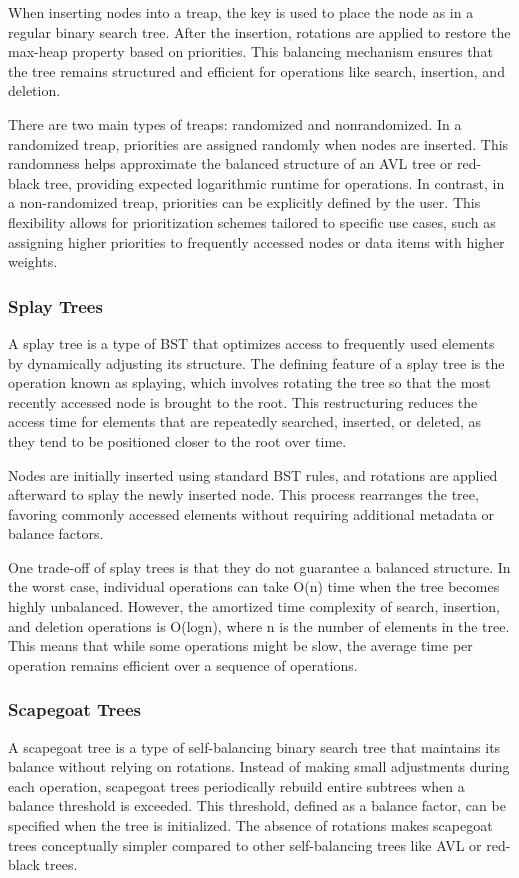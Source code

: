 \documentclass[sigconf]{acmart}
\begin{document}
When inserting nodes into a treap, the key is used to place the node as in a regular binary search tree. After the insertion, rotations are applied to restore the max-heap property based on priorities. This balancing mechanism ensures that the tree remains structured and efficient for operations like search, insertion, and deletion.

There are two main types of treaps: randomized and nonrandomized. In a randomized treap, priorities are assigned randomly when nodes are inserted. This randomness helps approximate the balanced structure of an AVL tree or red-black tree, providing expected logarithmic runtime for operations. In contrast, in a non-randomized treap, priorities can be explicitly defined by the user. This flexibility allows for prioritization schemes tailored to specific use cases, such as assigning higher priorities to frequently accessed nodes or data items with higher weights.

\subsubsection{Splay Trees}
A splay tree is a type of BST that optimizes access to frequently used elements by dynamically adjusting its structure. The defining feature of a splay tree is the operation known as splaying, which involves rotating the tree so that the most recently accessed node is brought to the root. This restructuring reduces the access time for elements that are repeatedly searched, inserted, or deleted, as they tend to be positioned closer to the root over time.

Nodes are initially inserted using standard BST rules, and rotations are applied afterward to splay the newly inserted node. This process rearranges the tree, favoring commonly accessed elements without requiring additional metadata or balance factors.

One trade-off of splay trees is that they do not guarantee a balanced structure. In the worst case, individual operations can take O(n) time when the tree becomes highly unbalanced. However, the amortized time complexity of search, insertion, and deletion operations is O(logn), where n is the number of elements in the tree. This means that while some operations might be slow, the average time per operation remains efficient over a sequence of operations.
\subsubsection{Scapegoat Trees}
A scapegoat tree is a type of self-balancing binary search tree that maintains its balance without relying on rotations. Instead of making small adjustments during each operation, scapegoat trees periodically rebuild entire subtrees when a balance threshold is exceeded. This threshold, defined as a balance factor, can be specified when the tree is initialized. The absence of rotations makes scapegoat trees conceptually simpler compared to other self-balancing trees like AVL or red-black trees.
\end{document}
